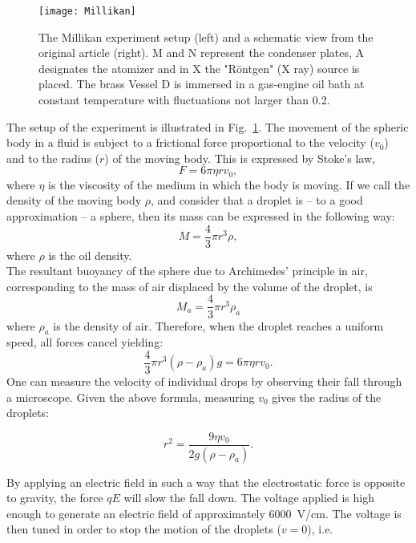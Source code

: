 \begin{figure}
    \centering
      \texttt{[image: Millikan]}
    \caption{The Millikan experiment setup (left) and a schematic view from the original article (right). M and N represent the condenser plates, A designates the atomizer and in X the "R\"ontgen" (X ray) source is placed. The brass Vessel D is immersed in a gas-engine oil bath at constant temperature with fluctuations not larger than \SI{0.2}{\deg}.}
    \label{fig:Millikan}
\end{figure}

The setup of the experiment is illustrated in Fig.~\ref{fig:Millikan}. The movement of the spheric body in a fluid is subject to a frictional force proportional to the velocity ($v_0$) and to the radius ($r$) of the moving body. This is expressed by Stoke's law,
\begin{equation*}
     F = 6 \pi \eta r v_0,
\end{equation*}
where $\eta$ is the viscosity of the medium in which the body is moving. If we call the density of the moving body $\rho$, and consider that a droplet is -- to a good approximation -- a sphere, then its mass can be expressed in the following way:
\begin{equation*}M = \frac{4}{3} \pi r^3 \rho,\end{equation*}
where $\rho$ is the oil density. \\

The resultant buoyancy of the sphere due to Archimedes' principle in air, corresponding to the mass of air displaced by the volume of the droplet, is
\begin{equation*}M_a = \frac{4}{3} \pi r^3 \rho_a\end{equation*}
where $\rho_a$ is the density of air. Therefore, when the droplet reaches a uniform speed, all forces cancel yielding:
\[
\frac{4}{3} \pi r^3 (\rho-\rho_a) g = 6 \pi \eta r v_0.
\]
One can measure the velocity of individual drops by observing their fall through a microscope. Given the above formula, measuring $v_0$ gives the radius of the droplets:

$$ r^2 = \frac{9 \eta v_0}{2 g (\rho - \rho_a)}.$$

By applying an electric field in such a way that the electrostatic force is opposite to gravity, the force $qE$ will slow the fall down. The voltage applied is high enough to generate an electric field of approximately \SI{6000}{V/cm}. The voltage is then tuned in order to stop the motion of the droplets ($v = 0$), i.e.

